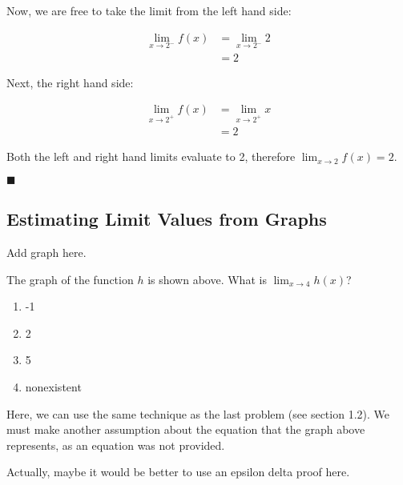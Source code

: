 \documentclass{article}
\begin{document}
Now, we are free to take the limit from the left hand side:

\begin{align}
    \lim_{x \to 2 ^ -} f(x)
        &= \lim_{x \to 2 ^ -} 2 \\
        &= 2
\end{align}

Next, the right hand side:

\begin{align}
    \lim_{x \to 2 ^ +} f(x)
        &= \lim_{x \to 2 ^ +} x \\
        &= 2
\end{align}

Both the left and right hand limits evaluate to 2, therefore $\lim_{x \to 2}
f(x) = 2$.

$\blacksquare$

\subsection{Estimating Limit Values from Graphs}

Add graph here.

The graph of the function $h$ is shown above. What is $\lim_{x \to 4} h(x)$?

\begin{enumerate}[label=\Alph*]
    \item -1
    \item 2
    \item 5
    \item nonexistent
\end{enumerate}

Here, we can use the same technique as the last problem (see section 1.2). We
must make another assumption about the equation that the graph above
represents, as an equation was not provided.

Actually, maybe it would be better to use an epsilon delta proof here.
\end{document}

